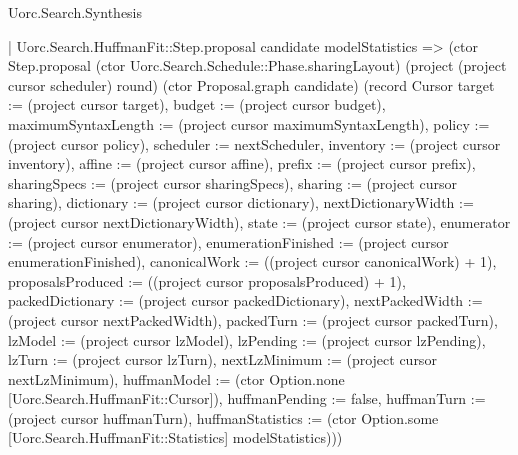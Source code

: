 \begin{lexlean}{Uorc.Search.Synthesis}
\begin{semanticmodule}
{      | Uorc.Search.HuffmanFit::Step.proposal candidate modelStatistics => (ctor Step.proposal (ctor Uorc.Search.Schedule::Phase.sharingLayout) (project (project cursor scheduler) round) (ctor Proposal.graph candidate) (record Cursor {target := (project cursor target), budget := (project cursor budget), maximumSyntaxLength := (project cursor maximumSyntaxLength), policy := (project cursor policy), scheduler := nextScheduler, inventory := (project cursor inventory), affine := (project cursor affine), prefix := (project cursor prefix), sharingSpecs := (project cursor sharingSpecs), sharing := (project cursor sharing), dictionary := (project cursor dictionary), nextDictionaryWidth := (project cursor nextDictionaryWidth), state := (project cursor state), enumerator := (project cursor enumerator), enumerationFinished := (project cursor enumerationFinished), canonicalWork := ((project cursor canonicalWork) + 1), proposalsProduced := ((project cursor proposalsProduced) + 1), packedDictionary := (project cursor packedDictionary), nextPackedWidth := (project cursor nextPackedWidth), packedTurn := (project cursor packedTurn), lzModel := (project cursor lzModel), lzPending := (project cursor lzPending), lzTurn := (project cursor lzTurn), nextLzMinimum := (project cursor nextLzMinimum), huffmanModel := (ctor Option.none [Uorc.Search.HuffmanFit::Cursor]), huffmanPending := false, huffmanTurn := (project cursor huffmanTurn), huffmanStatistics := (ctor Option.some [Uorc.Search.HuffmanFit::Statistics] modelStatistics)}))
}
\end{semanticmodule}
\end{lexlean}

